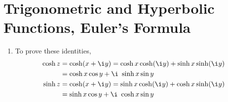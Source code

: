 \section{Trigonometric and Hyperbolic Functions, Euler's Formula}

\begin{enumerate}
    \item To prove these identities,
          \begin{align}
              \cosh z & = \cosh(x + \i y) = \cosh x \cosh(\i y) + \sinh x \sinh(\i y) \\
                      & = \cosh x \cos y + \i\ \sinh x \sin y                         \\
              \sinh z & = \cosh(x + \i y) = \sinh x \cosh(\i y) + \cosh x \sinh(\i y) \\
                      & = \sinh x \cos y + \i\ \cosh x \sin y
          \end{align}


\end{enumerate}
